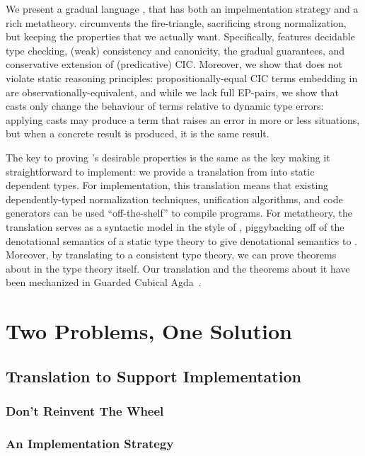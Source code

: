 We present a gradual language \lang, that has both an impelmentation strategy and a rich metatheory.
\lang circumvents the fire-triangle, sacrificing
strong normalization, but keeping the properties that we actually want. Specifically, \lang features decidable type checking,
(weak) consistency and canonicity, the gradual guarantees, and conservative extension of (predicative) CIC.
Moreover, we show that \lang does not violate static reasoning principles: propositionally-equal
CIC terms embedding in \lang are observationally-equivalent, and while we lack full EP-pairs,
we show that casts only change the behaviour of terms relative to dynamic type errors:
applying casts may produce a term that raises an error in more or less situations, but when a concrete
result is produced, it is the same result.

The key to proving \lang's desirable properties is the same as the key making it straightforward to implement:
we provide a translation from \lang into static dependent types.
For implementation, this translation means that existing dependently-typed normalization techniques, unification algorithms,
and code generators can be used ``off-the-shelf'' to compile \lang programs.
For metatheory, the translation serves as a syntactic model in the style of \citet{10.1145/3018610.3018620},
piggybacking off of the denotational semantics of a static type theory to give denotational semantics to \lang.
Moreover, by translating to a consistent type theory, we can prove theorems about \lang in the
type theory itself. Our translation and the theorems about it have been mechanized in Guarded Cubical Agda~\citep{TODO}.


\section{Two Problems, One Solution}


\subsection{Translation to Support Implementation}

\subsubsection{Don't Reinvent The Wheel}

\subsubsection{An Implementation Strategy}

